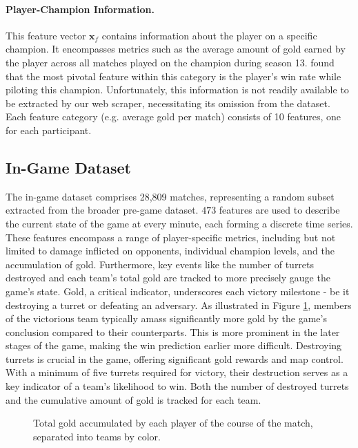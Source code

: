 \documentclass[12pt, a4paper, headinclude, twoside, plainheadsepline, open=right, numbers=noenddot, hidelinks, toc=listof, toc=bibliography]{scrreprt}
\begin{document}
\paragraph{Player-Champion Information.}
This feature vector $\mathbf{x}_f$ contains information about the player on a specific champion.
It encompasses metrics such as the average amount of gold earned by the player across all matches played on the champion during season 13. 
 \cite{costaFeatureAnalysisLeague2021} found that  the most pivotal feature within this category is the player's win rate while piloting this champion.
Unfortunately, this information is not readily available to be extracted by our web scraper,  necessitating its omission from the dataset.
Each feature category (e.g.  average gold per match) consists of 10 features, one for each participant.

\subsection{In-Game Dataset}
\label{ssec:in_game_data}

The in-game dataset comprises 28,809 matches, representing a random subset extracted from the broader pre-game dataset.
$473$ features are used to describe the current state of the game at every minute, each forming a discrete time series.
These features encompass a range of player-specific metrics, including but not limited to damage inflicted on opponents, individual champion levels, and the accumulation of gold.
Furthermore, key events like the number of turrets destroyed and each team's total gold are tracked to more precisely gauge the game's state. 
Gold, a critical indicator, underscores each victory milestone - be it destroying a turret or defeating an adversary. 
As illustrated in Figure \ref{fig:totalGold}, members of the victorious team typically amass significantly more gold by the game's conclusion compared to their counterparts.
This is more prominent in the later stages of the game, making the win prediction earlier more difficult.
Destroying turrets is crucial in the game, offering significant gold rewards and map control. 
With a minimum of five turrets required for victory, their destruction serves as a key indicator of a team's likelihood to win.
Both the number of destroyed turrets and the cumulative amount of gold is tracked for each team.

\begin{figure}

\caption{Total gold accumulated by each player of the course of the match, separated into teams by color. }
\label{fig:totalGold}
\end{figure}
\end{document}
